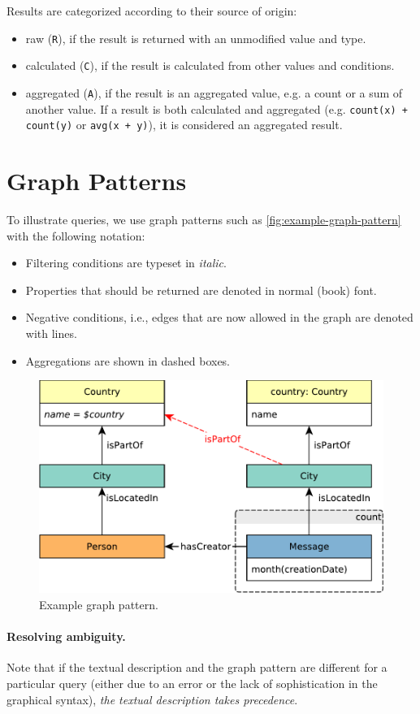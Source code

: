 
Results are categorized according to their source of origin:

\begin{itemize}
	\item raw (\texttt{R}), if the result is returned with an unmodified value and type.
	\item calculated (\texttt{C}), if the result is calculated from other values and conditions.
	\item aggregated (\texttt{A}), if the result is an aggregated value, e.g. a count or a sum of another value. If a result is both calculated and aggregated (e.g. \texttt{count(x) + count(y)} or \texttt{avg(x + y)}), it is considered an aggregated result.
\end{itemize}



\section{Graph Patterns}

To illustrate queries, we use graph patterns such as \autoref{fig:example-graph-pattern} with the following notation:

\begin{itemize}
	\item Filtering conditions are typeset in \textit{italic}.
	\item Properties that should be returned are denoted in normal (book) font.
	\item Negative conditions, i.e., edges that are now allowed in the graph are denoted with \textcolor{red}{} lines.
	\item Aggregations are shown in dashed boxes.
\end{itemize}

\begin{figure}[ht]
	\begin{center}
		\includegraphics[scale=\patternscale,margin=0cm .2cm]{patterns/bi-read-23}
		\caption{Example graph pattern.}
		\label{fig:example-graph-pattern}
	\end{center}
\end{figure}

\paragraph{Resolving ambiguity.} Note that if the textual description and the graph pattern are different for a particular query (either due to an error or the lack of sophistication in the graphical syntax), \emph{the textual description takes precedence}.
